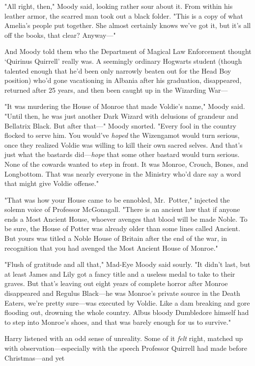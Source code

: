 "All right, then," Moody said, looking rather sour about it. From within his
leather armor, the scarred man took out a black folder. "This is a copy of what
Amelia's people put together. She almost certainly knows we've got it, but it's
all off the books, that clear? Anyway\mbox{---}"

And Moody told them who the Department of Magical Law Enforcement thought
`Quirinus Quirrell' really was. A seemingly ordinary Hogwarts student (though
talented enough that he'd been only narrowly beaten out for the Head Boy
position) who'd gone vacationing in Albania after his graduation, disappeared,
returned after 25 years, and then been caught up in the Wizarding War---

"It was murdering the House of Monroe that made Voldie's name," Moody said.
"Until then, he was just another Dark Wizard with delusions of grandeur and
Bellatrix Black. But after that\mbox{---}" Moody snorted. "Every fool in the country
flocked to serve him. You would've \emph{hoped} the Wizengamot would turn
serious, once they realized Voldie was willing to kill their own sacred selves.
And that's just what the bastards did---\emph{hope} that some other bastard
would turn serious. None of the cowards wanted to step in front. It was Monroe,
Crouch, Bones, and Longbottom. That was nearly everyone in the Ministry who'd
dare say a word that might give Voldie offense."

"That was how your House came to be ennobled, Mr.~Potter," injected the solemn
voice of Professor McGonagall. "There is an ancient law that if anyone ends a
Most Ancient House, whoever avenges that blood will be made Noble. To be sure,
the House of Potter was already older than some lines called Ancient. But yours
was titled a Noble House of Britain after the end of the war, in recognition
that you had avenged the Most Ancient House of Monroe."

"Flush of gratitude and all that," Mad-Eye Moody said sourly. "It didn't last,
but at least James and Lily got a fancy title and a useless medal to take to
their graves. But that's leaving out eight years of complete horror after
Monroe disappeared and Regulus Black---he was Monroe's private source in the
Death Eaters, we're pretty sure---was executed by Voldie. Like a dam breaking
and gore flooding out, drowning the whole country. Albus bloody Dumbledore
himself had to step into Monroe's shoes, and that was barely enough for us to
survive."

Harry listened with an odd sense of unreality. Some of it \emph{felt} right,
matched up with observation---especially with the speech Professor Quirrell had
made before Christmas---and yet{\el}

